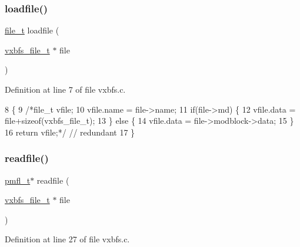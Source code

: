 \subsubsection{\texorpdfstring{loadfile()}{loadfile()}}
{\footnotesize\ttfamily \hyperlink{a00185_aa5445a6474a23ee3e7756d432dfa4ba1_aa5445a6474a23ee3e7756d432dfa4ba1}{file\+\_\+t} loadfile (\begin{DoxyParamCaption}\item[{\hyperlink{a00200_abb93e2407af0d8fe0f5629ce6456c6f9_abb93e2407af0d8fe0f5629ce6456c6f9}{vxbfs\+\_\+file\+\_\+t} $\ast$}]{file }\end{DoxyParamCaption})}



Definition at line 7 of file vxbfs.\+c.


\begin{DoxyCode}
8 \{
9     \textcolor{comment}{/*file\_t vfile;}
10 \textcolor{comment}{    vfile.name = file->name;}
11 \textcolor{comment}{    if(file->md) \{}
12 \textcolor{comment}{        vfile.data = file+sizeof(vxbfs\_file\_t);}
13 \textcolor{comment}{    \} else \{}
14 \textcolor{comment}{        vfile.data = file->modblock->data;}
15 \textcolor{comment}{    \}}
16 \textcolor{comment}{    return vfile;*/} \textcolor{comment}{// redundant}
17 \}
\end{DoxyCode}
\mbox{\label{a00197_a092e5bdd19e8369aa33901fffeb1f025_a092e5bdd19e8369aa33901fffeb1f025}} 
\subsubsection{\texorpdfstring{readfile()}{readfile()}}
{\footnotesize\ttfamily \hyperlink{a00185_a02f7eedc7de6c770b6b29a62905fc61d_a02f7eedc7de6c770b6b29a62905fc61d}{pmfl\+\_\+t}$\ast$ readfile (\begin{DoxyParamCaption}\item[{\hyperlink{a00200_abb93e2407af0d8fe0f5629ce6456c6f9_abb93e2407af0d8fe0f5629ce6456c6f9}{vxbfs\+\_\+file\+\_\+t} $\ast$}]{file }\end{DoxyParamCaption})}



Definition at line 27 of file vxbfs.\+c.


